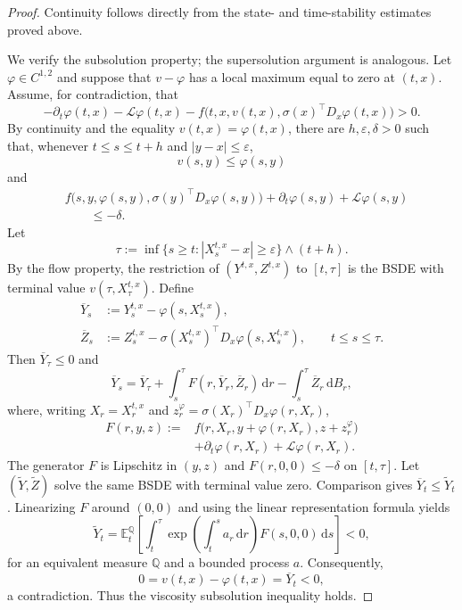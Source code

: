 \begin{proof}
Continuity follows directly from the state- and time-stability estimates
proved above.

We verify the subsolution property; the supersolution argument is
analogous.  Let $\varphi\in C^{1,2}$ and suppose that $v-\varphi$ has a
local maximum equal to zero at $(t,x)$.  Assume, for contradiction, that
\[
  -\partial_t\varphi(t,x)-\mathcal L\varphi(t,x)
  -f\bigl(t,x,v(t,x),\sigma(x)^\top D_x\varphi(t,x)\bigr)>0.
\]
By continuity and the equality $v(t,x)=\varphi(t,x)$, there are
$h,\varepsilon,\delta>0$ such that, whenever $t\le s\le t+h$ and
$|y-x|\le\varepsilon$,
\[
  v(s,y)\le\varphi(s,y)
\]
and
\[
\begin{aligned}
  &f\bigl(s,y,\varphi(s,y),
       \sigma(y)^\top D_x\varphi(s,y)\bigr)
    +\partial_t\varphi(s,y)+\mathcal L\varphi(s,y)\\
  &\qquad\le-\delta.
\end{aligned}
\]
Let
\[
  \tau:=\inf\{s\ge t:|X_s^{t,x}-x|\ge\varepsilon\}\wedge(t+h).
\]
By the flow property, the restriction of $(Y^{t,x},Z^{t,x})$ to
$[t,\tau]$ is the BSDE with terminal value $v(\tau,X_\tau^{t,x})$.
Define
\[
\begin{aligned}
  \overline Y_s
  &:=Y_s^{t,x}-\varphi(s,X_s^{t,x}),\\
  \overline Z_s
  &:=Z_s^{t,x}
    -\sigma(X_s^{t,x})^\top D_x\varphi(s,X_s^{t,x}),
  \qquad t\le s\le\tau.
\end{aligned}
\]
Then $\overline Y_\tau\le0$ and
\[
  \overline Y_s
  =\overline Y_\tau+
    \int_s^\tau F(r,\overline Y_r,\overline Z_r)\,\mathrm dr
    -\int_s^\tau\overline Z_r\,\mathrm dB_r,
\]
where, writing $X_r=X_r^{t,x}$ and
$z_r^\varphi=\sigma(X_r)^\top D_x\varphi(r,X_r)$,
\[
\begin{aligned}
  F(r,y,z)
  :={}&f\bigl(r,X_r,y+\varphi(r,X_r),z+z_r^\varphi\bigr)\\
      &+\partial_t\varphi(r,X_r)+\mathcal L\varphi(r,X_r).
\end{aligned}
\]
The generator $F$ is Lipschitz in $(y,z)$ and
$F(r,0,0)\le-\delta$ on $[t,\tau]$.  Let $(\widetilde Y,\widetilde Z)$
solve the same BSDE with terminal value zero.  Comparison gives
$\overline Y_t\le\widetilde Y_t$.  Linearizing $F$ around $(0,0)$ and
using the linear representation formula yields
\[
  \widetilde Y_t
  =\mathbb E_t^{\mathbb Q}\!\left[
    \int_t^\tau
      \exp\!\left(\int_t^s a_r\,\mathrm dr\right)
      F(s,0,0)\,\mathrm ds
  \right]<0,
\]
for an equivalent measure $\mathbb Q$ and a bounded process $a$.
Consequently,
\[
  0=v(t,x)-\varphi(t,x)=\overline Y_t<0,
\]
a contradiction.  Thus the viscosity subsolution inequality holds.
\end{proof}
